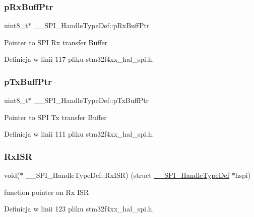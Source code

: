 \subsubsection{\texorpdfstring{p\+Rx\+Buff\+Ptr}{pRxBuffPtr}}
{\footnotesize\ttfamily uint8\+\_\+t$\ast$ \+\_\+\+\_\+\+S\+P\+I\+\_\+\+Handle\+Type\+Def\+::p\+Rx\+Buff\+Ptr}

Pointer to S\+PI Rx transfer Buffer 

Definicja w linii 117 pliku stm32f4xx\+\_\+hal\+\_\+spi.\+h.

\mbox{\label{struct_____s_p_i___handle_type_def_adb2e52ab20ae5ae6b89532155fec99af}} 
\subsubsection{\texorpdfstring{p\+Tx\+Buff\+Ptr}{pTxBuffPtr}}
{\footnotesize\ttfamily uint8\+\_\+t$\ast$ \+\_\+\+\_\+\+S\+P\+I\+\_\+\+Handle\+Type\+Def\+::p\+Tx\+Buff\+Ptr}

Pointer to S\+PI Tx transfer Buffer 

Definicja w linii 111 pliku stm32f4xx\+\_\+hal\+\_\+spi.\+h.

\mbox{\label{struct_____s_p_i___handle_type_def_a599045b20d284f94e5a367a85cad9f39}} 
\subsubsection{\texorpdfstring{Rx\+I\+SR}{RxISR}}
{\footnotesize\ttfamily void($\ast$ \+\_\+\+\_\+\+S\+P\+I\+\_\+\+Handle\+Type\+Def\+::\+Rx\+I\+SR) (struct \hyperlink{struct_____s_p_i___handle_type_def}{\+\_\+\+\_\+\+S\+P\+I\+\_\+\+Handle\+Type\+Def} $\ast$hspi)}

function pointer on Rx I\+SR 

Definicja w linii 123 pliku stm32f4xx\+\_\+hal\+\_\+spi.\+h.

